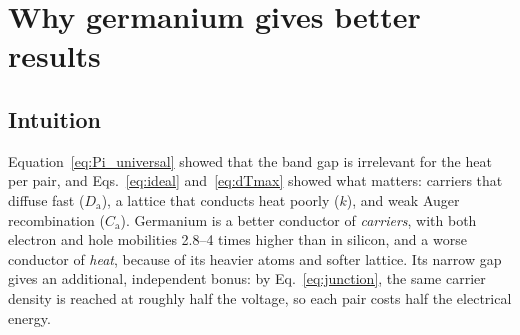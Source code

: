 \documentclass[11pt,a4paper]{article}
\newcommand{\Da}{D_{\mathrm{a}}}
\newcommand{\Ca}{C_{\mathrm{a}}}
\begin{document}
\section{Why germanium gives better results}\label{sec:ge}

\subsection{Intuition}
Equation~\eqref{eq:Pi_universal} showed that the band gap is irrelevant for the heat per pair, and Eqs.~\eqref{eq:ideal} and~\eqref{eq:dTmax} showed what matters: carriers that diffuse fast ($\Da$), a lattice that conducts heat poorly ($k$), and weak Auger recombination ($\Ca$). Germanium is a better conductor of \emph{carriers}, with both electron and hole mobilities 2.8--4 times higher than in silicon, and a worse conductor of \emph{heat}, because of its heavier atoms and softer lattice. Its narrow gap gives an additional, independent bonus: by Eq.~\eqref{eq:junction}, the same carrier density is reached at roughly half the voltage, so each pair costs half the electrical energy.
\end{document}
